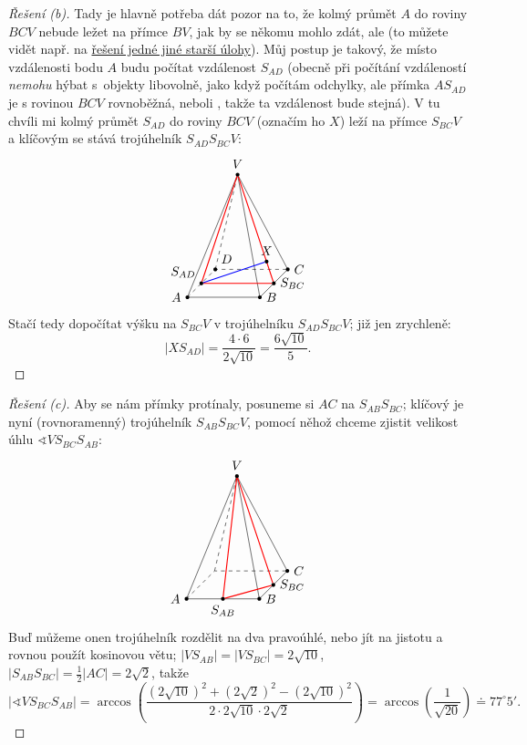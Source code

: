 \documentclass[10pt,a4paper]{extarticle}
\def\bod#1#2#3{\node[circle,fill=black,inner sep=0pt,outer sep=0pt,minimum size=3pt,label=#2:{$#3$}] (#3) at (#1) {};}
\def\zaklad{%
\draw[dashed] (0,0,1) -- (0,0,0) -- (1,0,0);%
\draw (1,0,0)-- (1,0,1) -- (0,0,1);
\draw (1,0,0) -- (.5,1.5,.5) -- (1,0,1);
\draw (0,0,1) -- (.5,1.5,.5);
\draw[dashed] (0,0,0) -- (.5,1.5,.5);
\bod{1,0,0}{right}{C}
\bod{1,0,1}{right}{B}
\bod{0,0,1}{left}{A}
\bod{.5,1.5,.5}{above}{V}
}
\theoremstyle{definition}
\def\st{^\circ}
\begin{document}
\begin{proof}[Řešení (b)]
Tady je hlavně potřeba dát pozor na to, že kolmý průmět $A$ do roviny $BCV$ nebude ležet na přímce $BV$, jak by se někomu mohlo zdát, ale  (to můžete vidět např. na \href{https://www.geogebra.org/3d/k3sqq9hb}{řešení jedné jiné starší úlohy}). Můj postup je takový, že místo vzdálenosti bodu $A$ budu počítat vzdálenost $S_{AD}$ (obecně při počítání vzdáleností \emph{nemohu} hýbat s~objekty libovolně, jako když počítám odchylky, ale přímka $AS_{AD}$ je s rovinou $BCV$ rovnoběžná, neboli , takže ta vzdálenost bude stejná). V tu chvíli mi kolmý průmět $S_{AD}$ do roviny $BCV$ (označím ho $X$) leží na přímce $S_{BC}V$ a klíčovým se stává trojúhelník $S_{AD}S_{BC}V$:
\[\begin{tikzpicture}[scale=2]
    \zaklad
    \bod{0,0,0}{above right}{D}
    \bod{0,0,.5}{above left}{S_{AD}}
    \bod{1,0,.5}{right}{S_{BC}}
    
    
    \draw[red, thick] (S_{AD}) -- (S_{BC}) -- (V) -- (S_{AD});
    \bod{.9,.3,.5}{above}{X}
    \draw[blue, thick] (S_{AD}) -- (X);
\end{tikzpicture}  \]
Stačí tedy dopočítat výšku na $S_{BC}V$ v trojúhelníku $S_{AD}S_{BC}V$; již jen zrychleně:
\[ |XS_{AD}| = \frac{4 \cdot 6}{2\sqrt{10}} = \frac{6 \sqrt{10}}{5}. \]
\end{proof}



\begin{proof}[Řešení (c)]
Aby se nám přímky protínaly, posuneme si $AC$ na $S_{AB}S_{BC}$; klíčový je nyní (rovnoramenný) trojúhelník $S_{AB}S_{BC}V$, pomocí něhož chceme zjistit velikost úhlu $\sphericalangle V S_{BC}S_{AB}$:
\[\begin{tikzpicture}[scale=2]
    \zaklad
    \bod{1,0,.5}{right}{S_{BC}}
    \bod{.5,0,1}{below}{S_{AB}}
    \draw[red, thick] (S_{AB}) -- (S_{BC}) -- (V) -- (S_{AB});
\end{tikzpicture} \]
Buď můžeme onen trojúhelník rozdělit na dva pravoúhlé, nebo jít na jistotu a rovnou použít kosinovou větu; $|VS_{AB}| = |VS_{BC}| = 2\sqrt{10}$, $|S_{AB}S_{BC}| = \frac12 |AC| = 2\sqrt2$, takže
\[ |\sphericalangle V S_{BC}S_{AB}| = \arccos\left( \frac{(2\sqrt{10})^2 + (2\sqrt2)^2 - (2\sqrt{10})^2}{2 \cdot 2\sqrt{10} \cdot 2\sqrt2} \right) = \arccos\left(\frac{1}{\sqrt{20}} \right) \doteq 77\st5'. \]
\end{proof}
\end{document}
